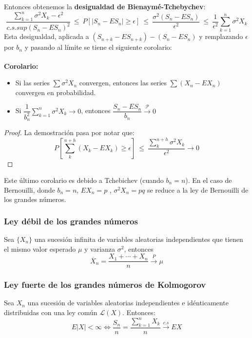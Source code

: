 Entonces obtenemos la \textbf{desigualdad de Bienaymé-Tchebychev}:
$$\frac{\displaystyle\sum_{k=1}^n \sigma^2 X_k-\epsilon ^2}{c.s.sup(S_n-ES_n)^2} 
\ \leq \ 
P[|S_n-ES_n|\geq \epsilon]
\ \leq \ 
\frac{\sigma^2(S_n-ES_n)}{\epsilon^2} 
\ \leq \ 
\frac{1}{\epsilon^2}\sum_{k=1}^n\sigma^2 X_k$$
Esta desigualdad, aplicada a $(S_{n+k}-ES_{n+k})-(S_n-ES_n)$ y remplazando $\epsilon$ por $b_n$ y pasando al límite se tiene el siguiente corolario:
\\\\
\textbf{Corolario: }
\begin{itemize}
\item Si las series $\sum\sigma^2 X_n$ convergen, entonces las series $\sum (X_n-EX_n)$ convergen en probabilidad.
\item Si $\dfrac{1}{b_n^2}\displaystyle\sum_{k=1}^n \sigma^2 X_k\rightarrow 0$, entonces $\dfrac{S_n - ES_n}{b_n}\stackrel{\mathcal{P}}{\rightarrow}0$\\
\end{itemize}
\begin{proof}
La demostración pasa por notar que:
$$P \left[\sum_{k}^{n+h}(X_k - EX_k)\geq\epsilon\right]
\ \leq \ \dfrac{\displaystyle\sum_{k}^{n+h}\sigma^2 X_k}{\epsilon^2}\longrightarrow 0$$
\end{proof}
Este último corolario es debido a Tchebichev (cuando $b_n=n$). En el caso de Bernouilli, donde $b_n=n$, $EX_n=p$ , $\sigma^2 X_n=pq$ se reduce a la ley de Bernouilli de los grandes números.


\subsubsection{Ley débil de los grandes números}
Sea $\{X_n\}$ una sucesión infinita de variables aleatorias independientes que tienen el mismo valor esperado $\mu$ y varianza $\sigma^2$, entonces 
$$
 \overline{X}_n = \frac{X_1+\cdots+X_n}{n} 
 \stackrel{P}{\longrightarrow} \mu
$$

\subsubsection{Ley fuerte de los grandes números de Kolmogorov}
Sea ${X_n}$ una sucesión de variables aleatorias independientes e idénticamente distribuidas con una ley común $\mathcal{L}(X)$. Entonces:
$$E|X| < \infty
\Longleftrightarrow 
\dfrac{S_n}{n}=\dfrac{\sum_{k=1}^n X_k}{n}\stackrel{c.s}{\longrightarrow}EX$$


